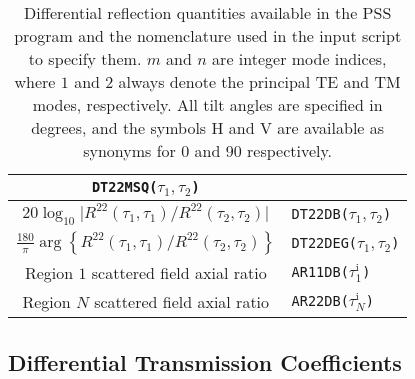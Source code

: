 \documentclass[11pt]{article}
\renewcommand{\inc}{^{\text{i}}}
\renewcommand{\abs}[1]{\bigl\lvert#1\bigr\rvert}
\begin{document}
\begin{table}[htbp]
\begin{center}
\begin{tabular}{|c|l|}
        \verb_DT22MSQ(_$\tau_1,\tau_2$\verb_)_ \\ \hline
      $20\log_{10}\abs{R^{22}(\tau_1,\tau_1) / 
        R^{22}(\tau_2,\tau_2)}$ & 
        \verb_DT22DB(_$\tau_1,\tau_2$\verb_)_ \\ \hline
      $\frac{180}{\pi}\arg\left\{R^{22}(\tau_1,\tau_1) / 
        R^{22}(\tau_2,\tau_2)\right\}$ & 
        \verb_DT22DEG(_$\tau_1,\tau_2$\verb_)_ \\ \hline
        Region $1$ scattered field axial ratio & 
        \verb_AR11DB(_$\tau_1\inc$\verb_)_ \\ \hline
        Region $N$ scattered field axial ratio & 
        \verb_AR22DB(_$\tau_N\inc$\verb_)_ \\ \hline
    \end{tabular}
    \caption[Differential reflection quantities available in the PSS
      program]%
    {Differential reflection quantities available in the PSS program
      and the nomenclature used in the input script to specify them. 
      $m$ and $n$ are integer mode indices, where $1$ and $2$ always
      denote the principal TE and TM modes, respectively. All
      tilt angles are specified in degrees, and the symbols
      \textsf{H} and \textsf{V} are available as synonyms
      for \textsf{0}  and \textsf{90} respectively.} 
    \label{tab:drefl}
  \end{center}
\end{table}

\cleardoublepage
\newpage


\subsection{Differential Transmission Coefficients}
\end{document}
